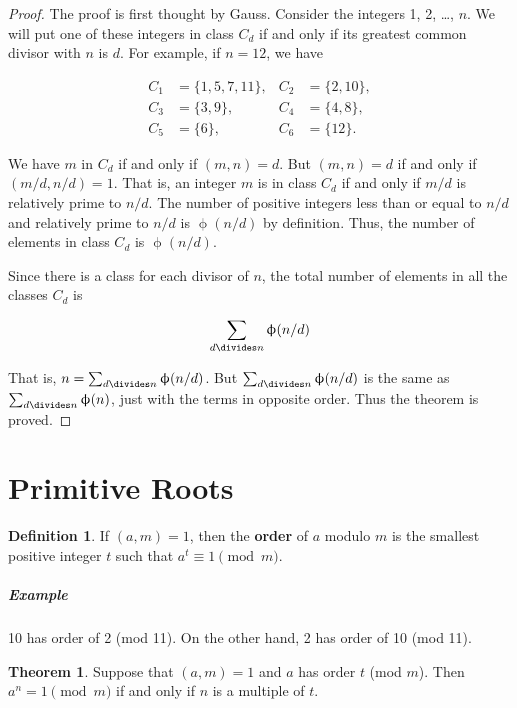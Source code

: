\documentclass{article}
\theoremstyle{definition} %
\newtheorem{theorem}{Theorem}[section] %
\theoremstyle{definition}
\theoremstyle{definition}
\newcommand{\tot}{\upphi}
\theoremstyle{definition}
\newtheorem{definition}{Definition}[section]
\begin{document}
  \begin{proof}
    The proof is first thought by Gauss. Consider the integers 1, 2, \dots, $n$. We will put one of
    these integers in class $C_d$ if and only if its greatest common divisor with $n$ is $d$.
    For example, if $n = 12$, we have
    
    \begin{align*}
      C_1 &= \{1, 5, 7, 11\},& C_2 &= \{2, 10\}, \\
      C_3 &= \{3, 9\},& C_4 &= \{4, 8\}, \\
      C_5 &= \{6\},& C_6 &= \{12\}.
    \end{align*}
    
    We have $m$ in $C_d$ if and only if $(m, n) = d$. But $(m, n) = d$ if and only if
    $(m/d, n/d) = 1$. That is, an integer $m$ is in class $C_d$ if and only if $m/d$ is
    relatively prime to $n/d$. The number of positive integers less than or equal to
    $n/d$ and relatively prime to $n/d$ is $\tot(n/d)$ by definition. Thus, the number
    of elements in class $C_d$ is $\tot(n/d)$.
    
    Since there is a class for each divisor of $n$, the total number of elements in all
    the classes $C_d$ is
    
    \[ \sum_{d\divides n}\tot(n/d) \]
    
    That is, $n = \sum_{d\divides n}\tot(n/d)$. But $\sum_{d\divides n}\tot(n/d)$ is
    the same as $\sum_{d\divides n}\tot(n)$, just with the terms in opposite order.
    Thus the theorem is proved.
  \end{proof}
  
  \section{Primitive Roots}
  
  \begin{definition}
    If $(a, m) = 1$, then the \textbf{order} of $a$ modulo $m$ is the smallest positive
    integer $t$ such that $a^t \equiv 1 \pmod{m}$.
  \end{definition}
  
  \subparagraph{Example} 10 has order of 2 (mod 11). On the other hand, 2 has order of 10 (mod 11).
  
  \begin{theorem}
    Suppose that $(a, m) = 1$ and $a$ has order $t$ (mod $m$). Then $a^n = 1 \pmod{m}$ if and only if
    $n$ is a multiple of $t$.
  \end{theorem}
  
\end{document}
